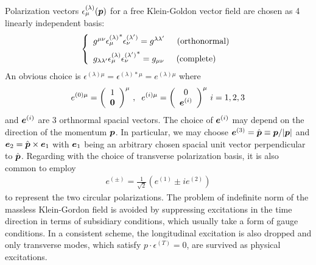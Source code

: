 Polarization vectors $\epsilon_\mu^{(\lambda)} (\mbox{\boldmath $p$})$
for a free Klein-Goldon vector field 
are chosen as 4 linearly independent basis:
\begin{eqnarray}
\left\{
\begin{array}{l}
g^{\mu \nu }{\epsilon_\mu^{(\lambda)}}^*   \epsilon_\nu^{(\lambda')}
=
g^{\lambda \lambda'}
\hspace{5mm}
\mbox{(orthonormal)}
\vspace{2mm}
\\
g_{\lambda \lambda'} \epsilon_\mu^{(\lambda)} {\epsilon_\nu^{(\lambda')}}^* 
= g_{\mu \nu}
\hspace{5mm}
\mbox{(complete)}
\end{array}
\right.
\label{eqn:APolOrthComp}
\end{eqnarray}
An obvious choice is $\epsilon^{(\lambda)\mu} = \epsilon^{(\lambda)*\mu} = e^{(\lambda)\mu}$
where
\begin{eqnarray}
e^{(0)\mu} =
\left(
\begin{array}{c}
1\\ \mbox{\boldmath $0$}
\end{array}
\right)^\mu
\,,
\hspace{2mm}
e^{(i)\mu} =
\left(
\begin{array}{c}
0\\ \mbox{\boldmath $e$}^{(i)}
\end{array}
\right)^\mu
\,
i = 1, 2, 3
\label{eqn:APolBasis}
\end{eqnarray}
and $\mbox{\boldmath $e$}^{(i)}$ are 3 orthnormal spacial vectors.
The choice of $\mbox{\boldmath $e$}^{(i)}$ may depend on the direction of
the momentum $\mbox{\boldmath $p$}$.
In particular, we may choose $\mbox{\boldmath $e$}^{(3)} = \hat{\mbox{\boldmath $p$}} \equiv \mbox{\boldmath $p$} / |\mbox{\boldmath $p$}|$  and
$\mbox{\boldmath $e$}_2 = \hat{\mbox{\boldmath $p$}} \times \mbox{\boldmath $e$}_1$ with
$\mbox{\boldmath $e$}_1$ being an arbitrary chosen spacial unit vector perpendicular 
to $\hat{\mbox{\boldmath $p$}}$. Regarding with the choice of transverse polarization basis,
it is also common to employ
\begin{eqnarray}
e^{(\pm)} = \frac{1}{\sqrt{2}} 
\left(
e^{(1)} \pm i e^{(2)}
\right)
\label{eqn:APolCircPol}
\end{eqnarray}
to represent the two circular polarizations.
The problem of indefinite norm of the massless Klein-Gordon field
is avoided by suppressing excitations in the time direction in terms of
subsidiary conditions, which usually take a form of gauge conditions.
In a consistent scheme, the longitudinal excitation is also dropped 
and only transverse modes, which satisfy $p \cdot \epsilon^{(T)} = 0$,
 are survived as physical excitations.

